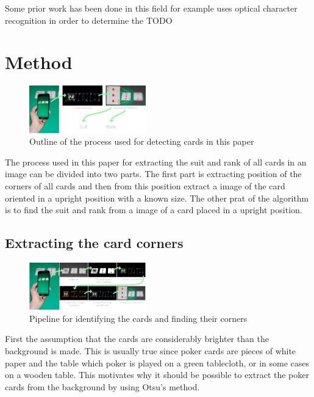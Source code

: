 \documentclass[journal,twoside]{IEEEtran}
\begin{document}
Some prior work has been done in this field for example \cite{PokerVision} uses optical character recognition in order to determine the 
TODO


\section{Method}

\begin{figure}[placement h]
\centering
\includegraphics[width=0.45\textwidth]{images/outline.png}
\caption{Outline of the process used for detecting cards in this paper}
\label{fig:AlgOutline}
\end{figure}

The process used in this paper for extracting the suit and rank of all cards in an image can be divided into two parts. The first part is extracting position of the corners of all cards and then from this position extract a image of the card oriented in a upright position with a known size. The other prat of the algorithm is to find the suit and rank from a image of a card placed in a upright position.

\subsection{Extracting the card corners}

\begin{figure}[placement h]
\centering
\includegraphics[width=0.45\textwidth]{images/detection.png}
\caption{Pipeline for identifying the cards and finding their corners}
\label{fig:CornerOutline}
\end{figure}

First the assumption that the cards are considerably brighter than the background is made. This is usually true since poker cards are pieces of white paper and the table which poker is played on a green tablecloth, or in some cases on a wooden table.
This motivates why it should be possible to extract the poker cards from the background by using Otsu's method\cite{OTSU}.
\end{document}
